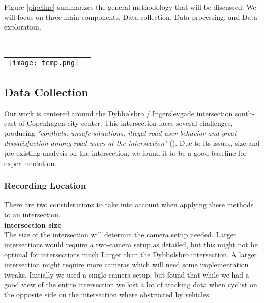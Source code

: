 
Figure \ref{pipeline} summarizes the general methodology that will be discussed. We will focus
on three main components, Data collection, Data processing, and Data exploration.

\ \\ 
\noindent
\begin{tabular}{@{}cc}
\texttt{[image: temp.png]} 
\end{tabular}
\label{pipeline}

\subsection{Data Collection}
Our work is centered around the Dybbølsbro / Ingerslevgade intersection south-east of Copenhagen
city center. This intersection faces several challenges, producing \textit{"conflicts, unsafe situations, illegal 
road user behavior and great dissatisfaction among road users at the intersection"} (\cite{CPHpost_2021}).
Due to its issues, size and pre-existing analysis on the intersection, we found it to be a good baseline
for experimentation.

\subsubsection{Recording Location}

There are two considerations to take into account when applying these methods to an intersection.
\ \\

\textbf{intersection size} \\
The size of the intersection will determin the camera setup needed. Larger intersections would require a two-camera setup as detailed, but this might not be optimal for intersections much Larger
than the Dybbølsbro intersection. A larger intersection might require more cameras which will need some implementation tweaks. Initially we used a single camera setup, but found that
while we had a good view of the entire intersection we lost a lot of tracking data when cyclist on the opposite side on the intersection where obstructed by vehicles.
\ \\

